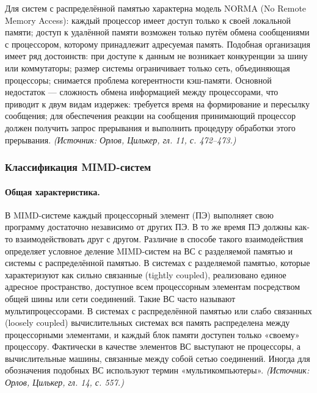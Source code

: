 \documentclass[a4paper,12pt]{article}
\begin{document}
Для систем с распределённой памятью характерна модель NORMA (No Remote Memory Access): каждый процессор имеет доступ только к своей локальной памяти; доступ к удалённой памяти возможен только путём обмена сообщениями с процессором, которому принадлежит адресуемая память. Подобная организация имеет ряд достоинств: при доступе к данным не возникает конкуренции за шину или коммутаторы; размер системы ограничивает только сеть, объединяющая процессоры; снимается проблема когерентности кэш-памяти. Основной недостаток — сложность обмена информацией между процессорами, что приводит к двум видам издержек: требуется время на формирование и пересылку сообщения; для обеспечения реакции на сообщения принимающий процессор должен получить запрос прерывания и выполнить процедуру обработки этого прерывания.
\textit{(Источник: Орлов, Цилькер, гл. 11, с. 472--473.)}

\subsubsection{Классификация MIMD-систем}

\paragraph{Общая характеристика.}
В MIMD-системе каждый процессорный элемент (ПЭ) выполняет свою программу достаточно независимо от других ПЭ. В то же время ПЭ должны как-то взаимодействовать друг с другом. Различие в способе такого взаимодействия определяет условное деление MIMD-систем на ВС с разделяемой памятью и системы с распределённой памятью. В системах с разделяемой памятью, которые характеризуют как сильно связанные (tightly coupled), реализовано единое адресное пространство, доступное всем процессорным элементам посредством общей шины или сети соединений. Такие ВС часто называют мультипроцессорами. В системах с распределённой памятью или слабо связанных (loosely coupled) вычислительных системах вся память распределена между процессорными элементами, и каждый блок памяти доступен только «своему» процессору. Фактически в качестве элементов ВС выступают не процессоры, а вычислительные машины, связанные между собой сетью соединений. Иногда для обозначения подобных ВС используют термин «мультикомпьютеры».
\textit{(Источник: Орлов, Цилькер, гл. 14, с. 557.)}
\end{document}
